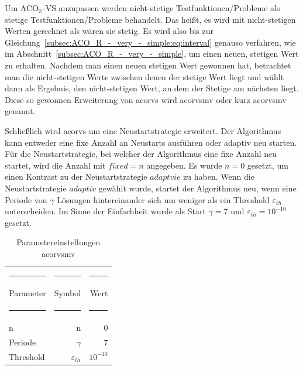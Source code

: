\documentclass[fontsize=12, a4aper]{scrartcl}
\begin{document}
	Um ACO\(_\mathbb{R}\)-VS anzupassen werden nicht-stetige Testfunktionen/Probleme als stetige Testfunktionen/Probleme behandelt. Das heißt, es wird mit nicht-stetigen Werten gerechnet als wären sie stetig. Es wird also bis zur Gleichung~\ref{subsec:ACO_R_-_very_-_simple:eq:interval} genauso verfahren, wie im Abschnitt~\ref{subsec:ACO_R_-_very_-_simple}, um einen neuen, stetigen Wert zu erhalten. Nachdem man einen neuen stetigen Wert gewonnen hat, betrachtet man die nicht-stetigen Werte zwischen denen der stetige Wert liegt und wählt dann als Ergebnis, den nicht-stetigen Wert, an dem der Stetige am nächsten liegt. Diese so gewonnen Erweiterung von \ac{acorvs} wird \acl{acorvsmv} oder kurz \ac{acorvsmv} genannt.\hfill\newline
	
	Schließlich wird \ac{acorvs} um eine Neustartstrategie erweitert. Der Algorithmus kann entweder eine fixe Anzahl an Neustarts ausführen oder adaptiv neu starten. Für die Neustartstrategie, bei welcher der Algorithmus eine fixe Anzahl neu startet, wird die Anzahl mit \(fixed = n\) angegeben. Es wurde \(n = 0\) gesetzt, um einen Kontrast zu der Neustartstrategie \(adaptvie\) zu haben. Wenn die Neustartstrategie \(adaptiv\) gewählt wurde, startet der Algorithmus neu, wenn eine Periode von \(\gamma\) Lösungen hintereinander sich um weniger als ein Threshold \(\varepsilon_{th}\) unterscheiden. Im Sinne der Einfachheit wurde als Start \(\gamma = 7\) und \(\varepsilon_{th} = 10^{-10}\) gesetzt. 
	
	\begin{table}[H]
		\fontsize{10pt}{12pt}
		
		\caption{Parametereinstellungen \ac{acorvsmv}}
		\label{subsec:Grundlagen:tab:ACO_R_VS_MV_Parametereinstellungen}
		
		\begin{tabularx}{\textwidth}{l|r|r}
			
			\rule{4.6cm}{0.4pt} & \rule{4.6cm}{0.4pt}& \rule{4.6cm}{0.4pt}\\
			
			Parameter & Symbol & Wert\\
			
			\rule{4.6cm}{0.4pt} & \rule{4.6cm}{0.4pt}& \rule{4.6cm}{0.4pt}\\
			n 			& n			 & 0\\
			Periode 	& \(\gamma\) & 7\\
			Threshold 	& \(\varepsilon_{th}\) & \(10^{-10}\)
			
		\end{tabularx}
		
	\end{table}
	
\end{document}
